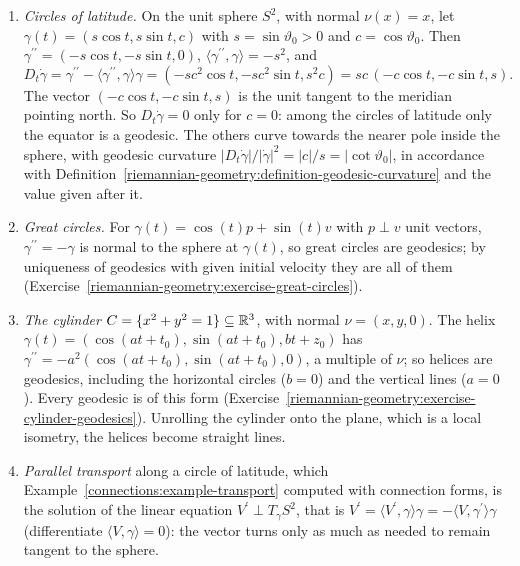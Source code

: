 \begin{example}\label{riemannian-geometry:example-tangential-projection}
\begin{enumerate}
\item \emph{Circles of latitude.} On the unit sphere $S^2$, with normal $\nu(x) = x$, let $\gamma(t) = (s\cos t, s\sin t, c)$ with $s = \sin\vartheta_0 > 0$ and $c = \cos\vartheta_0$. Then $\gamma^{\prime\prime} = (-s\cos t, -s\sin t, 0)$,
$\langle\gamma^{\prime\prime}, \gamma\rangle = -s^2$, and
\[
D_t\dot\gamma = \gamma^{\prime\prime} - \langle\gamma^{\prime\prime}, \gamma\rangle\gamma = (-sc^2\cos t, -sc^2\sin t, s^2c) = sc\,(-c\cos t, -c\sin t, s) .
\]
The vector $(-c\cos t, -c\sin t, s)$ is the unit tangent to the meridian pointing north. So $D_t\dot\gamma = 0$ only for $c = 0$: among the circles of latitude only the equator is a geodesic. The others curve
towards the nearer pole inside the sphere, with geodesic curvature $|D_t\dot\gamma|/|\dot\gamma|^2 = |c|/s = |\cot\vartheta_0|$, in accordance with
Definition~\ref{riemannian-geometry:definition-geodesic-curvature} and the value given after it.
\item \emph{Great circles.} For $\gamma(t) = \cos(t)p + \sin(t)v$ with $p \perp v$ unit vectors, $\gamma^{\prime\prime} = -\gamma$ is normal to the sphere at $\gamma(t)$, so great circles are geodesics; by uniqueness of
geodesics with given initial velocity they are all of them (Exercise~\ref{riemannian-geometry:exercise-great-circles}).
\item \emph{The cylinder} $C = \{x^2 + y^2 = 1\} \subseteq \mathbb{R}^3$, with normal $\nu = (x, y, 0)$. The helix $\gamma(t) = (\cos(at + t_0), \sin(at + t_0), bt + z_0)$ has $\gamma^{\prime\prime} = -a^2(\cos(at + t_0), \sin(at + t_0), 0)$, a
multiple of $\nu$; so helices are geodesics, including the horizontal circles ($b = 0$) and the vertical lines ($a = 0$). Every geodesic is of this form
(Exercise~\ref{riemannian-geometry:exercise-cylinder-geodesics}). Unrolling the cylinder onto the plane, which is a local isometry, the helices become straight lines.
\item \emph{Parallel transport} along a circle of latitude, which Example~\ref{connections:example-transport} computed with connection forms, is the solution of the linear equation $V^{\prime} \perp T_\gamma S^2$,
that is $V^{\prime} = \langle V^{\prime}, \gamma\rangle\gamma = -\langle V, \gamma^{\prime}\rangle\gamma$ (differentiate $\langle V, \gamma\rangle = 0$): the vector turns only as much as needed to remain tangent to the sphere.
\end{enumerate}
\end{example}


